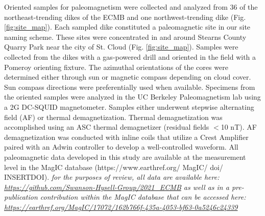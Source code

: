 \documentclass[draft]{agujournal2019}
\begin{document}
Oriented samples for paleomagnetism were collected and analyzed from 36 of the northeast-trending dikes of the ECMB and one northwest-trending dike (Fig. \ref{fig:site_map}). Each sampled dike constituted a paleomagnetic site in our site naming scheme. These sites were concentrated in and around Stearns County Quarry Park near the city of St. Cloud (Fig. \ref{fig:site_map}). Samples were collected from the dikes with a gas-powered drill and oriented in the field with a Pomeroy orienting fixture. The azimuthal orientations of the cores were determined either through sun or magnetic compass depending on cloud cover. Sun compass directions were preferentially used when available. Specimens from the oriented samples were analyzed in the UC Berkeley Paleomagnetism lab using a 2G DC-SQUID magnetometer. Samples either underwent stepwise alternating field (AF) or thermal demagnetization. Thermal demagnetization was accomplished using an ASC thermal demagnetizer (residual fields $<$10 nT). AF demagnetization was conducted with inline coils that utilize a Crest Amplifier paired with an Adwin controller to develop a well-controlled waveform. All paleomagnetic data developed in this study are available at the measurement level in the MagIC database (https://www.earthref.org/ MagIC/ doi/ INSERTDOI). \textit{for the purposes of review, all data are available here: \url{https://github.com/Swanson-Hysell-Group/2021_ECMB} as well as in a pre-publication contribution within the MagIC database that can be accessed here: \url{https://earthref.org/MagIC/17072/162b766f-435a-4053-bf63-0a5246c24339}}
\end{document}
